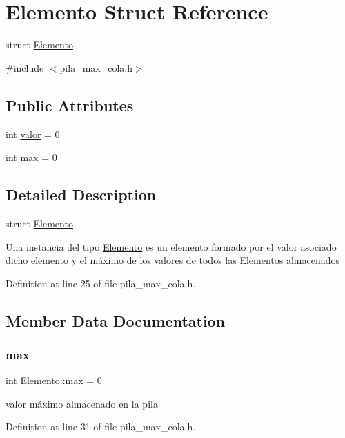 \hypertarget{structElemento}{}\section{Elemento Struct Reference}
\label{structElemento}


struct \hyperlink{structElemento}{Elemento}  




{\ttfamily \#include $<$pila\+\_\+max\+\_\+cola.\+h$>$}

\subsection*{Public Attributes}
\begin{DoxyCompactItemize}
\item 
int \hyperlink{structElemento_a2fd2452d8e9cbe64efec8ca6c7f7b7eb}{valor} = 0
\item 
int \hyperlink{structElemento_a9971eb72e5c21f568f1135947c3919f7}{max} = 0
\end{DoxyCompactItemize}


\subsection{Detailed Description}
struct \hyperlink{structElemento}{Elemento} 

Una instancia del tipo \hyperlink{structElemento}{Elemento} es un elemento formado por el valor asociado dicho elemento y el máximo de los valores de todos las Elementos almacenados 

Definition at line 25 of file pila\+\_\+max\+\_\+cola.\+h.



\subsection{Member Data Documentation}
\mbox{\label{structElemento_a9971eb72e5c21f568f1135947c3919f7}} 
\subsubsection{\texorpdfstring{max}{max}}
{\footnotesize\ttfamily int Elemento\+::max = 0}

valor máximo almacenado en la pila 

Definition at line 31 of file pila\+\_\+max\+\_\+cola.\+h.

